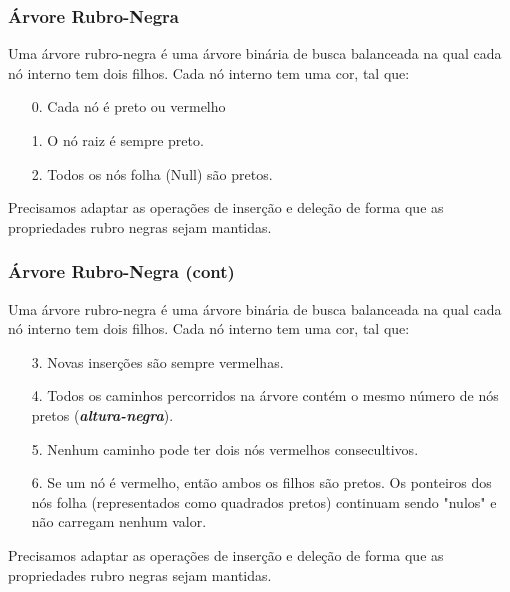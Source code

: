 \begin{frame}[fragile]
  \frametitle{Árvore Rubro-Negra}
\begin{theorem}
Uma árvore rubro-negra é uma árvore binária de busca balanceada na 
qual cada nó interno tem dois filhos. Cada nó interno tem uma cor, 
tal que:

\begin{itemize}
\item[0.] Cada nó é preto ou vermelho 
\item[1.] O nó raiz é sempre preto.
\item[2.] Todos os nós folha (Null) são pretos.
\end{itemize}
\end{theorem}

Precisamos adaptar as operações de inserção e deleção de forma que as 
propriedades rubro negras sejam mantidas.
\end{frame}

\begin{frame}[fragile]
  \frametitle{Árvore Rubro-Negra (cont)}
\begin{theorem}
Uma árvore rubro-negra é uma árvore binária de busca balanceada na 
qual cada nó interno tem dois filhos. Cada nó interno tem uma cor, 
tal que:

\begin{itemize}
\item[3.] Novas inserções são sempre vermelhas.  
\item[4.] Todos os caminhos percorridos na árvore contém o mesmo número de nós pretos (\textbf{\emph{altura-negra}}).
\item[5.] Nenhum caminho pode ter dois nós vermelhos consecultivos. 
\item[6.] Se um nó é vermelho, então ambos os filhos são pretos. Os ponteiros 
          dos nós folha (representados como quadrados pretos) continuam sendo "nulos" e não carregam nenhum valor.
\end{itemize}
\end{theorem}

Precisamos adaptar as operações de inserção e deleção de forma que as 
propriedades rubro negras sejam mantidas.
\end{frame}

